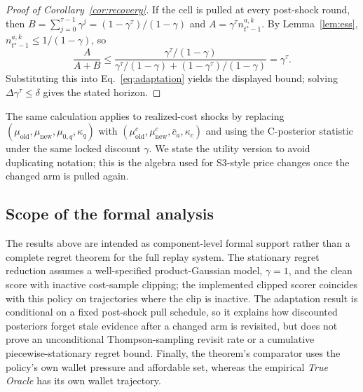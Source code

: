 \begin{proof}[Proof of Corollary~\ref{cor:recovery}]
If the cell is pulled at every post-shock round, then
$B=\sum_{j=0}^{\tau-1}\gamma^j=(1-\gamma^\tau)/(1-\gamma)$ and
$A=\gamma^\tau n^{a,k}_{t^\star-1}$. By Lemma~\ref{lem:ess},
$n^{a,k}_{t^\star-1}\leq1/(1-\gamma)$, so
\[
\frac{A}{A+B}
\leq
\frac{\gamma^\tau/(1-\gamma)}
{\gamma^\tau/(1-\gamma)+(1-\gamma^\tau)/(1-\gamma)}
=\gamma^\tau .
\]
Substituting this into Eq.~\eqref{eq:adaptation} yields the displayed bound; solving
$\Delta\gamma^\tau\leq\delta$ gives the stated horizon.
\end{proof}

\begin{remark}
The same calculation applies to realized-cost shocks by replacing
$(\mu_{\mathrm{old}},\mu_{\mathrm{new}},\mu_{0,q},\kappa_q)$ with
$(\mu^c_{\mathrm{old}},\mu^c_{\mathrm{new}},\bar c_a,\kappa_c)$ and
using the C-posterior statistic under the same locked discount $\gamma$. We state the utility version to avoid
duplicating notation; this is the algebra used for S3-style price changes once
the changed arm is pulled again.
\end{remark}

\subsection{Scope of the formal analysis}
\label{app:proof-limitations}

The results above are intended as component-level formal support rather than a
complete regret theorem for the full replay system. The stationary regret
reduction assumes a well-specified product-Gaussian model, $\gamma=1$, and the
clean score with inactive cost-sample clipping; the implemented clipped scorer
coincides with this policy on trajectories where the clip is inactive. The
adaptation result is conditional on a fixed post-shock pull schedule, so it
explains how discounted posteriors forget stale evidence after a changed arm is
revisited, but does not prove an unconditional Thompson-sampling revisit rate or
a cumulative piecewise-stationary regret bound. Finally, the theorem's comparator
uses the policy's own wallet pressure and affordable set, whereas the empirical
\emph{True Oracle} has its own wallet trajectory.
